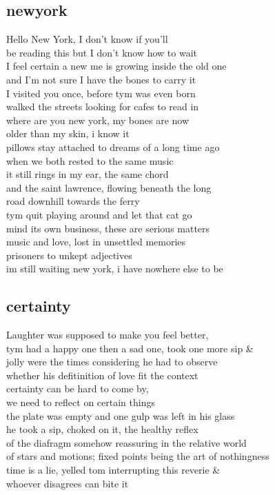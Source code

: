 \documentclass{article}
\begin{document}
\clearpage

\subsection{newyork}

Hello New York, I don't know if you'll\\
be reading this but I don't know how to wait\\
I feel certain a new me is growing inside the old one\\
and I'm not sure I have the bones to carry it\\
I visited you once, before tym was even born\\
walked the streets looking for cafes to read in\\

where are you new york, my bones are now\\
older than my skin, i know it\\
pillows stay attached to dreams of a long time ago\\
when we both rested to the same music\\
it still rings in my ear, the same chord\\
and the saint lawrence, flowing beneath the long\\
road downhill towards the ferry\\

tym quit playing around and let that cat go\\
mind its own business, these are serious matters\\
music and love, lost in unsettled memories\\
prisoners to unkept adjectives\\
im still waiting new york, i have nowhere else to be\\
\clearpage

\subsection{certainty}

Laughter was supposed to make you feel better,\\
tym had a happy one then a sad one, took one more sip &\\
jolly were the times considering he had to observe\\
whether his defitinition of love fit the context\\
certainty can be hard to come by,\\
we need to reflect on certain things\\
the plate was empty and one gulp was left in his glass\\

he took a sip, choked on it, the healthy reflex\\
of the diafragm somehow reassuring in the relative world\\
of stars and motions; fixed points being the art of nothingness\\
time is a lie, yelled tom interrupting this reverie \&\\
whoever disagrees can bite it\\
\end{document}
